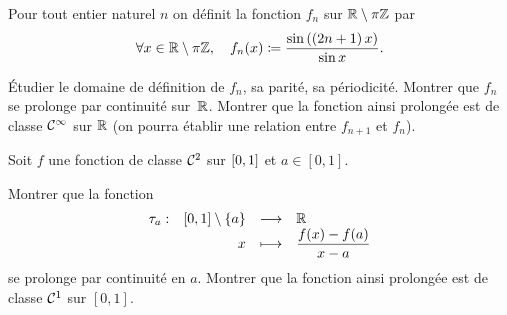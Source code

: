 \documentclass{magnolia}
\begin{document}


Pour tout entier naturel $n$ on définit la fonction $f_n$ sur
$\mathbb{R}\setminus\pi\mathbb{Z}$ par
\[\forall x\in\mathbb{R}\setminus\pi\mathbb{Z} ,\quad
  f_n(x)\coloneqq \frac{\sin\left(\left(2n+1\right)x\right)}{\sin x}.\]
\begin{questions}
\question Étudier le domaine de définition de $f_n$, sa parité, sa périodicité.
\question Montrer que $f_n$ se prolonge par continuité sur~$\mathbb{R}$. 
\question Montrer que la fonction ainsi prolongée est de classe
  $\mathcal{C}^{\infty}$ sur $\mathbb{R}$ (on pourra établir une relation entre $f_{n+1}$
  et $f_n$).
\end{questions}

Soit $f$ une fonction de classe $\mathcal{C}^{2}$ sur $\left[0,1\right]$ et
$a\in[0,1]$. 
\begin{questions}
\question Montrer que la fonction
  \[\dspappli{\tau_a}{\interf{0}{1}\setminus\ens{a}}{\R}{x}{%
    \frac{f(x)-f(a)}{x-a}}\]
  se prolonge par continuité en $a$.
\question Montrer que la fonction ainsi prolongée est de classe $\mathcal{C}^{1}$ sur
  $[0,1]$.
\end{questions}
\end{document}
